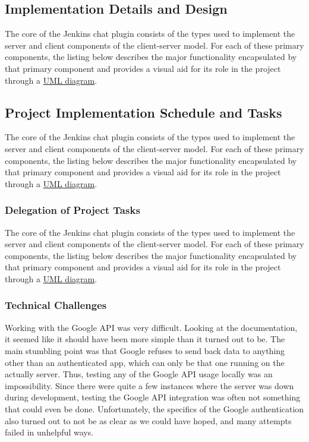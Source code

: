 \documentclass{article}
\begin{document}
		\subsection[Server Implementation]{Implementation Details and Design}
		The core of the Jenkins chat plugin consists of the types used to
		implement the server and client components of the client-server model.
		For each of these primary components, the listing below describes the
		major functionality encapsulated by that primary component and provides
		a visual aid for its role in the project through a 
		\href{http://www.csci.csusb.edu/dick/samples/uml0.html}{UML diagram}.

		\subsection[Implementation Schedule]{Project Implementation Schedule and Tasks}
		The core of the Jenkins chat plugin consists of the types used to
		implement the server and client components of the client-server model.
		For each of these primary components, the listing below describes the
		major functionality encapsulated by that primary component and provides
		a visual aid for its role in the project through a 
		\href{http://www.csci.csusb.edu/dick/samples/uml0.html}{UML diagram}.

			\subsubsection[Task Delegation]{Delegation of Project Tasks}
			The core of the Jenkins chat plugin consists of the types used to
			implement the server and client components of the client-server model.
			For each of these primary components, the listing below describes the
			major functionality encapsulated by that primary component and provides
			a visual aid for its role in the project through a 
			\href{http://www.csci.csusb.edu/dick/samples/uml0.html}{UML diagram}.

			\subsubsection[Technical Challenges]{Technical Challenges}
			Working with the Google API was very difficult.
			Looking at the documentation, it seemed like it should have been more simple
			than it turned out to be. The main stumbling point was that Google refuses to
			send back data to anything other than an authenticated app, which can only be
			that one running on the actually server. Thus, testing any of the Google API
			usage locally was an impossibility. Since there were quite a few instances
			where the server was down during development, testing the Google API integration
			was often not something that could even be done. Unfortunately, the specifics
			of the Google authentication also turned out to not be as clear as we could
			have hoped, and many attempts failed in unhelpful ways.
\end{document}
